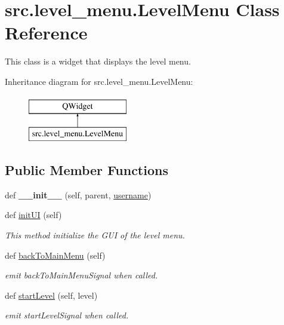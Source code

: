 \hypertarget{classsrc_1_1level__menu_1_1_level_menu}{}\section{src.\+level\+\_\+menu.\+Level\+Menu Class Reference}
\label{classsrc_1_1level__menu_1_1_level_menu}


This class is a widget that displays the level menu.  


Inheritance diagram for src.\+level\+\_\+menu.\+Level\+Menu\+:\begin{figure}[H]
\begin{center}
\leavevmode
\includegraphics[height=2.000000cm]{classsrc_1_1level__menu_1_1_level_menu}
\end{center}
\end{figure}
\subsection*{Public Member Functions}
\begin{DoxyCompactItemize}
\item 
\hypertarget{classsrc_1_1level__menu_1_1_level_menu_a39fd7912eb9a473b0fb03b5ae1bd0d84}{}def {\bfseries \+\_\+\+\_\+init\+\_\+\+\_\+} (self, parent, \hyperlink{classsrc_1_1level__menu_1_1_level_menu_aee1d2148e23a2908c72c4a8f8ad0a98f}{username})\label{classsrc_1_1level__menu_1_1_level_menu_a39fd7912eb9a473b0fb03b5ae1bd0d84}

\item 
def \hyperlink{classsrc_1_1level__menu_1_1_level_menu_a85ba6c3a92e1f256f70186866f2795ac}{init\+U\+I} (self)
\begin{DoxyCompactList}\small\item\em This method initialize the G\+U\+I of the level menu. \end{DoxyCompactList}\item 
def \hyperlink{classsrc_1_1level__menu_1_1_level_menu_a5852c765b18d5e6c28d5fdb7ebf80427}{back\+To\+Main\+Menu} (self)
\begin{DoxyCompactList}\small\item\em emit back\+To\+Main\+Menu\+Signal when called. \end{DoxyCompactList}\item 
def \hyperlink{classsrc_1_1level__menu_1_1_level_menu_aafc4b32a91edcdf2a10f5de32efbda2a}{start\+Level} (self, level)
\begin{DoxyCompactList}\small\item\em emit start\+Level\+Signal when called. \end{DoxyCompactList}\end{DoxyCompactItemize}
